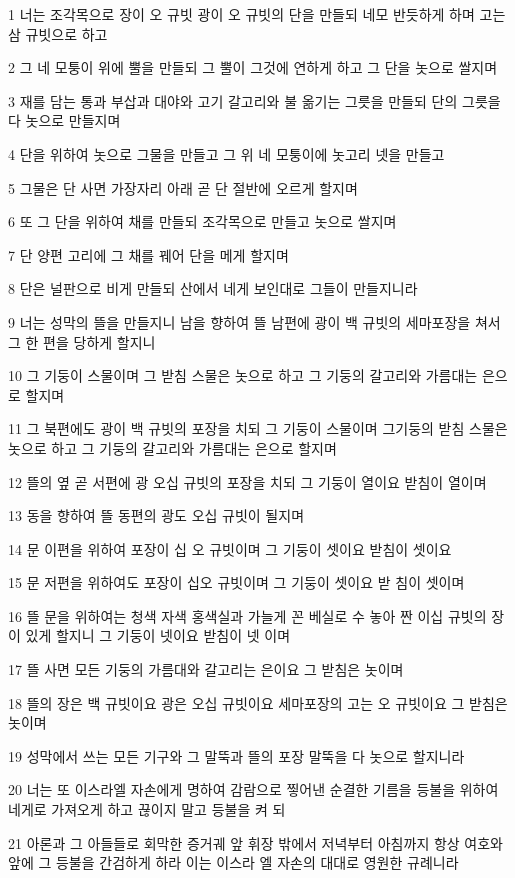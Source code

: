 \par 1 너는 조각목으로 장이 오 규빗 광이 오 규빗의 단을 만들되 네모 반듯하게 하며 고는 삼 규빗으로 하고
\par 2 그 네 모퉁이 위에 뿔을 만들되 그 뿔이 그것에 연하게 하고 그 단을 놋으로 쌀지며
\par 3 재를 담는 통과 부삽과 대야와 고기 갈고리와 불 옮기는 그릇을 만들되 단의 그릇을 다 놋으로 만들지며
\par 4 단을 위하여 놋으로 그물을 만들고 그 위 네 모퉁이에 놋고리 넷을 만들고
\par 5 그물은 단 사면 가장자리 아래 곧 단 절반에 오르게 할지며
\par 6 또 그 단을 위하여 채를 만들되 조각목으로 만들고 놋으로 쌀지며
\par 7 단 양편 고리에 그 채를 꿰어 단을 메게 할지며
\par 8 단은 널판으로 비게 만들되 산에서 네게 보인대로 그들이 만들지니라
\par 9 너는 성막의 뜰을 만들지니 남을 향하여 뜰 남편에 광이 백 규빗의 세마포장을 쳐서 그 한 편을 당하게 할지니
\par 10 그 기둥이 스물이며 그 받침 스물은 놋으로 하고 그 기둥의 갈고리와 가름대는 은으로 할지며
\par 11 그 북편에도 광이 백 규빗의 포장을 치되 그 기둥이 스물이며 그기둥의 받침 스물은 놋으로 하고 그 기둥의 갈고리와 가름대는 은으로 할지며
\par 12 뜰의 옆 곧 서편에 광 오십 규빗의 포장을 치되 그 기둥이 열이요 받침이 열이며
\par 13 동을 향하여 뜰 동편의 광도 오십 규빗이 될지며
\par 14 문 이편을 위하여 포장이 십 오 규빗이며 그 기둥이 셋이요 받침이 셋이요
\par 15 문 저편을 위하여도 포장이 십오 규빗이며 그 기둥이 셋이요 받 침이 셋이며
\par 16 뜰 문을 위하여는 청색 자색 홍색실과 가늘게 꼰 베실로 수 놓아 짠 이십 규빗의 장이 있게 할지니 그 기둥이 넷이요 받침이 넷 이며
\par 17 뜰 사면 모든 기둥의 가름대와 갈고리는 은이요 그 받침은 놋이며
\par 18 뜰의 장은 백 규빗이요 광은 오십 규빗이요 세마포장의 고는 오 규빗이요 그 받침은 놋이며
\par 19 성막에서 쓰는 모든 기구와 그 말뚝과 뜰의 포장 말뚝을 다 놋으로 할지니라
\par 20 너는 또 이스라엘 자손에게 명하여 감람으로 찧어낸 순결한 기름을 등불을 위하여 네게로 가져오게 하고 끊이지 말고 등불을 켜 되
\par 21 아론과 그 아들들로 회막한 증거궤 앞 휘장 밖에서 저녁부터 아침까지 항상 여호와 앞에 그 등불을 간검하게 하라 이는 이스라 엘 자손의 대대로 영원한 규례니라

